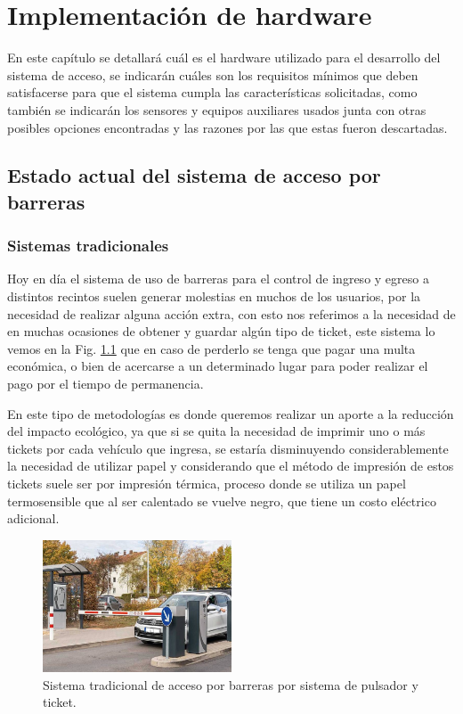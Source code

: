 \chapter{Implementación de hardware}
En este capítulo se detallará cuál es el hardware utilizado para el desarrollo del sistema de acceso, se indicarán cuáles
son los requisitos mínimos que deben satisfacerse para que el sistema cumpla las características solicitadas, como
también se indicarán los sensores y equipos auxiliares usados junta con otras posibles opciones encontradas y las
razones por las que estas fueron descartadas.


\section{Estado actual del sistema de acceso por barreras}

\subsection{Sistemas tradicionales}

Hoy en día el sistema de uso de barreras para el control de ingreso y egreso a distintos recintos suelen generar molestias
en muchos de los usuarios, por la necesidad de realizar alguna acción extra, con esto nos referimos a la necesidad de
en muchas ocasiones de obtener y guardar algún tipo de ticket, este sistema lo vemos en la Fig. \ref{fig:sistema-tradicional}
 que en caso de perderlo se tenga que pagar una multa económica, o bien de acercarse a un determinado lugar para poder realizar el pago por el tiempo de permanencia.

En este tipo de metodologías es donde queremos realizar un aporte a la reducción del impacto ecológico, ya que si se quita
la necesidad de imprimir uno o más tickets por cada vehículo que ingresa, se estaría disminuyendo considerablemente la
necesidad de utilizar papel y considerando que el método de impresión de estos tickets suele ser por impresión térmica,
proceso donde se utiliza un papel termosensible que al ser calentado se vuelve negro, que tiene un costo 
eléctrico adicional.
\begin{figure}
    \centering
    \includegraphics[width=0.5\textwidth]{imgs/sistema-control-acceso-barreras.jpg}
    \caption{Sistema tradicional de acceso por barreras por sistema de pulsador y ticket.}
    \label{fig:sistema-tradicional}
\end{figure}

